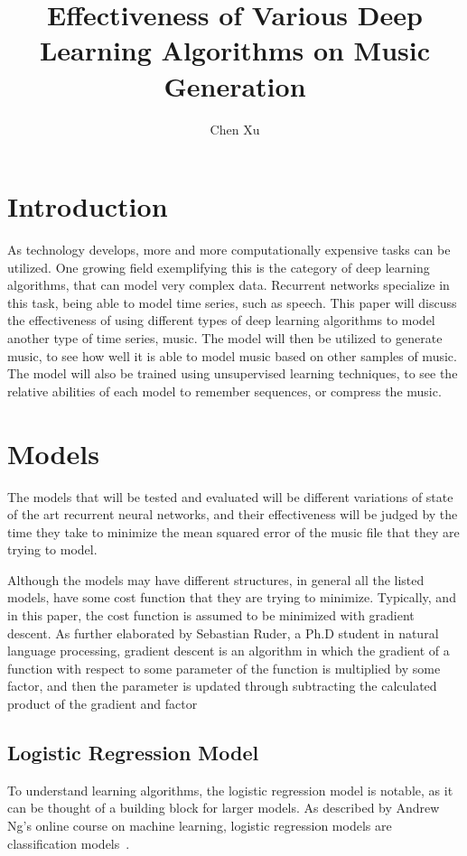 \documentclass[12pt]{article}
\begin{document}
\doublespacing
\author{Chen Xu}
\title{Effectiveness of Various Deep Learning Algorithms on Music Generation}
\maketitle

\section{Introduction}
As technology develops, more and more computationally expensive tasks can be
utilized. One growing field exemplifying this is the category of deep learning
algorithms, that can model very complex data.  Recurrent networks specialize in
this task, being able to model time series, such as speech. This paper will
discuss the effectiveness of using different types of deep learning algorithms
to model another type of time series, music. The model will then be utilized to
generate music, to see how well it is able to model music based on other samples
of music. The model will also be trained using unsupervised learning techniques,
to see the relative abilities of each model to remember sequences, or compress
the music.

\section{Models}
The models that will be tested and evaluated will be different variations of
state of the art recurrent neural networks, and their effectiveness will be
judged by the time they take to minimize the mean squared error of the music
file that they are trying to model.

Although the models may have different structures, in general all the listed
models, have some cost function that they are trying to minimize. Typically, and
in this paper, the cost function is assumed to be minimized with gradient
descent.  As further elaborated by Sebastian Ruder, a Ph.D student in natural
language processing, gradient descent is an algorithm in which the gradient of a
function with respect to some parameter of the function is multiplied by some
factor, and then the parameter is updated through subtracting the calculated
product of the gradient and factor~\cite{graddescent}

\subsection{Logistic Regression Model}
To understand learning algorithms, the logistic regression model is notable, as
it can be thought of a building block for larger models. As described by Andrew
Ng's online course on machine learning, logistic regression
models are classification models~\cite{ngcourse}.
\end{document}
